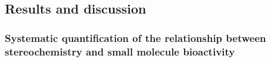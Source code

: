 \subsection{Results and discussion}



\subsubsection{Systematic quantification of the relationship between stereochemistry and small molecule bioactivity}
\label{Stereoisomers_Rel_Stereo_Bioactivity}



